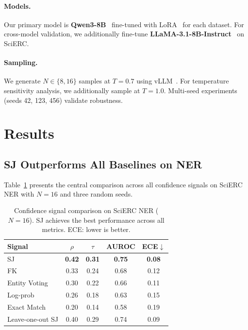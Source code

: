 \documentclass[11pt,a4paper]{article}
\begin{document}
\paragraph{Models.}
Our primary model is \textbf{Qwen3-8B}~\cite{qwen2025qwen3} fine-tuned with LoRA~\cite{hu2022lora} for each dataset. For cross-model validation, we additionally fine-tune \textbf{LLaMA-3.1-8B-Instruct}~\cite{touvron2023llama} on SciERC.

\paragraph{Sampling.}
We generate $N \in \{8, 16\}$ samples at $T{=}0.7$ using vLLM~\cite{kwon2023efficient}. For temperature sensitivity analysis, we additionally sample at $T{=}1.0$. Multi-seed experiments (seeds 42, 123, 456) validate robustness.

\section{Results}
\label{sec:results}

\subsection{SJ Outperforms All Baselines on NER}
\label{sec:main_ner}

Table~\ref{tab:main_ner} presents the central comparison across all confidence signals on SciERC NER with $N{=}16$ and three random seeds.

\begin{table}[t]
\centering
\small
\caption{Confidence signal comparison on SciERC NER ($N{=}16$). SJ achieves the best performance across all metrics. ECE: lower is better.}
\label{tab:main_ner}
\begin{tabular}{lcccc}
\toprule
\textbf{Signal} & \textbf{$\rho$} & \textbf{$\tau$} & \textbf{AUROC} & \textbf{ECE}$\downarrow$ \\
\midrule
SJ & \textbf{0.42} & \textbf{0.31} & \textbf{0.75} & \textbf{0.08} \\
FK & 0.33 & 0.24 & 0.68 & 0.12 \\
Entity Voting & 0.30 & 0.22 & 0.66 & 0.11 \\
Log-prob & 0.26 & 0.18 & 0.63 & 0.15 \\
Exact Match & 0.20 & 0.14 & 0.58 & 0.19 \\
\midrule
Leave-one-out SJ & 0.40 & 0.29 & 0.74 & 0.09 \\
\bottomrule
\end{tabular}
\end{table}
\end{document}
